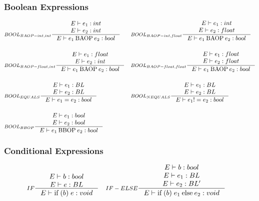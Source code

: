 \subsubsection{Boolean Expressions}
\begin{align*}
&\inference[$BOOL_{BAOP-int,int}$]{E \vdash e_1 : int \\
                       E \vdash e_2 : int}
                    {E \vdash e_1 \mathbin{\textrm{BAOP}} e_2 : bool}
&
&\inference[$BOOL_{BAOP-int,float}$]{E \vdash e_1 : int \\
                       E \vdash e_2 : float}
                    {E \vdash e_1 \mathbin{\textrm{BAOP}} e_2 : bool}
\\\\
&\inference[$BOOL_{BAOP-float,int}$]{E \vdash e_1 : float \\
                       E \vdash e_2 : int}
                    {E \vdash e_1 \mathbin{\textrm{BAOP}} e_2 : bool}
&
&\inference[$BOOL_{BAOP-float,float}$]{E \vdash e_1 : float \\
                       E \vdash e_2 : float}
                    {E \vdash e_1 \mathbin{\textrm{BAOP}} e_2 : bool}
\\\\
&\inference[$BOOL_{EQUALS}$]{E \vdash e_1 : BL \\
                       E \vdash e_2 : BL}
                    {E \vdash e_1 = e_2 : bool}
&
&\inference[$BOOL_{NEQUALS}$]{E \vdash e_1 : BL \\
                       E \vdash e_2 : BL}
                    {E \vdash e_1 != e_2 : bool}
\\\\
&\inference[$BOOL_{BBOP}$]{E \vdash e_1 : bool \\
                       E \vdash e_2 : bool}
                    {E \vdash e_1 \mathbin{\textrm{BBOP}} e_2 : bool}
\end{align*}
\subsubsection{Conditional Expressions}
\begin{align*}
&\inference[$IF$]{E \vdash b : bool \\
                  E \vdash e : BL}
                 {E \vdash \mathbin{\textrm{if}} \; (b) \; {e}: void}
&
&\inference[$IF-ELSE$]{E \vdash b : bool \\
                  E \vdash e_1 : BL \\
                  E \vdash e_2 : BL'}
                 {E \vdash \mathbin{\textrm{if}} \; (b) \; {e_1} \mathbin{\textrm{else}} {e_2}: void}
\end{align*}


